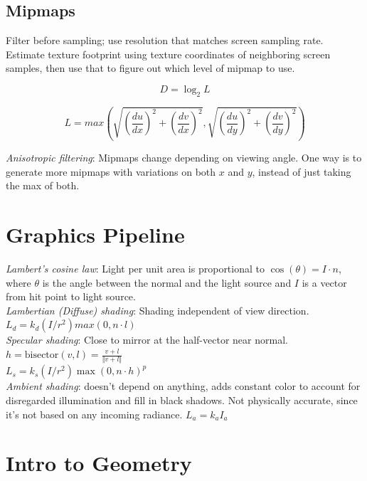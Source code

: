 \documentclass[10pt,landscape]{article}
\begin{document}
\begin{multicols}{3}
\subsection{Mipmaps}

Filter before sampling; use resolution that matches screen sampling rate. Estimate texture footprint using texture coordinates of neighboring screen samples, then use that to figure out which level of mipmap to use.

$$D = \log_2 L$$

$$L = max\left(\sqrt{\left(\frac{du}{dx}\right)^2 + \left(\frac{dv}{dx}\right)^2}, \sqrt{\left(\frac{du}{dy}\right)^2 + \left(\frac{dv}{dy}\right)^2}\right)$$

\textit{Anisotropic filtering}: Mipmaps change depending on viewing angle. One way is to generate more mipmaps with variations on both $x$ and $y$, instead of just taking the max of both.


\section{Graphics Pipeline}

\textit{Lambert's cosine law}: Light per unit area is proportional to $\cos(\theta) = I \cdot n$, where $\theta$ is the angle between the normal and the light source and $I$ is a vector from hit point to light source. \\
\textit{Lambertian (Diffuse) shading}: Shading independent of view direction. $L_d = k_d (I / r^2) max(0, n\cdot l)$ \\
\textit{Specular shading}: Close to mirror at the half-vector near normal. $h = \text{bisector}(v, l) = \frac{v + l}{\Vert v + l \Vert}$ \\
$L_s = k_s(I / r^2) \max(0, n \cdot h)^p$ \\
\textit{Ambient shading}: doesn't depend on anything, adds constant color to account for disregarded illumination and fill in black shadows. Not physically accurate, since it's not based on any incoming radiance. $L_a = k_a I_a$


\section{Intro to Geometry}


\end{multicols}
\end{document}
